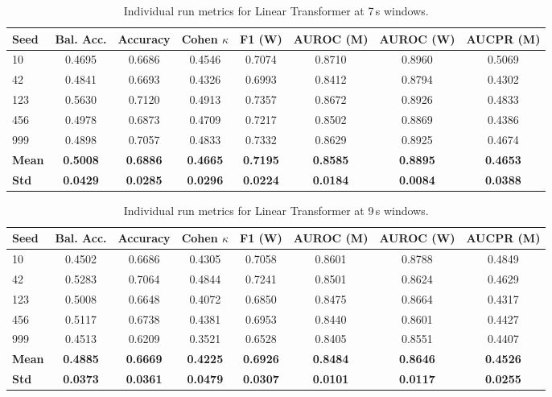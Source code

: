 \begin{table}[htbp]
\centering
\caption{Individual run metrics for Linear Transformer at 7\,s windows.}
\label{tab:app_metrics_linear_7s}
\footnotesize
\setlength{\tabcolsep}{2.5pt}
\begin{tabular}{l | c | c | c | c | c | c | c}
\textbf{Seed} & \textbf{Bal. Acc.} & \textbf{Accuracy} & \textbf{Cohen \(\kappa\)} & \textbf{F1 (W)} & \textbf{AUROC (M)} & \textbf{AUROC (W)} & \textbf{AUCPR (M)} \\
\hline
10  & 0.4695 & 0.6686 & 0.4546 & 0.7074 & 0.8710 & 0.8960 & 0.5069 \\
42  & 0.4841 & 0.6693 & 0.4326 & 0.6993 & 0.8412 & 0.8794 & 0.4302 \\
123 & 0.5630 & 0.7120 & 0.4913 & 0.7357 & 0.8672 & 0.8926 & 0.4833 \\
456 & 0.4978 & 0.6873 & 0.4709 & 0.7217 & 0.8502 & 0.8869 & 0.4386 \\
999 & 0.4898 & 0.7057 & 0.4833 & 0.7332 & 0.8629 & 0.8925 & 0.4674 \\
\hline
\textbf{Mean} & \textbf{0.5008} & \textbf{0.6886} & \textbf{0.4665} & \textbf{0.7195} & \textbf{0.8585} & \textbf{0.8895} & \textbf{0.4653} \\
\textbf{Std} & \textbf{0.0429} & \textbf{0.0285} & \textbf{0.0296} & \textbf{0.0224} & \textbf{0.0184} & \textbf{0.0084} & \textbf{0.0388} \\
\hline
\end{tabular}
\setlength{\tabcolsep}{6pt}
\end{table}

\begin{table}[htbp]
\centering
\caption{Individual run metrics for Linear Transformer at 9\,s windows.}
\label{tab:app_metrics_linear_9s}
\footnotesize
\setlength{\tabcolsep}{2.5pt}
\begin{tabular}{l | c | c | c | c | c | c | c}
\textbf{Seed} & \textbf{Bal. Acc.} & \textbf{Accuracy} & \textbf{Cohen \(\kappa\)} & \textbf{F1 (W)} & \textbf{AUROC (M)} & \textbf{AUROC (W)} & \textbf{AUCPR (M)} \\
\hline
10  & 0.4502 & 0.6686 & 0.4305 & 0.7058 & 0.8601 & 0.8788 & 0.4849 \\
42  & 0.5283 & 0.7064 & 0.4844 & 0.7241 & 0.8501 & 0.8624 & 0.4629 \\
123 & 0.5008 & 0.6648 & 0.4072 & 0.6850 & 0.8475 & 0.8664 & 0.4317 \\
456 & 0.5117 & 0.6738 & 0.4381 & 0.6953 & 0.8440 & 0.8601 & 0.4427 \\
999 & 0.4513 & 0.6209 & 0.3521 & 0.6528 & 0.8405 & 0.8551 & 0.4407 \\
\hline
\textbf{Mean} & \textbf{0.4885} & \textbf{0.6669} & \textbf{0.4225} & \textbf{0.6926} & \textbf{0.8484} & \textbf{0.8646} & \textbf{0.4526} \\
\textbf{Std} & \textbf{0.0373} & \textbf{0.0361} & \textbf{0.0479} & \textbf{0.0307} & \textbf{0.0101} & \textbf{0.0117} & \textbf{0.0255} \\
\hline
\end{tabular}
\setlength{\tabcolsep}{6pt}
\end{table}

